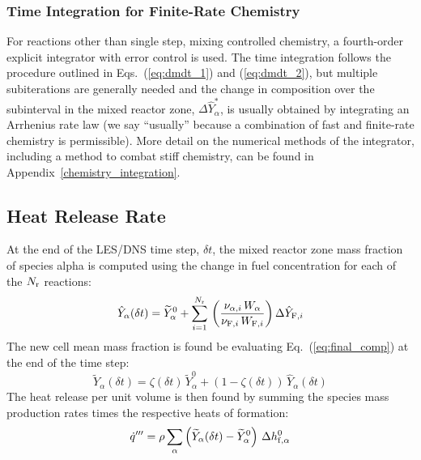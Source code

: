 \subsubsection{Time Integration for Finite-Rate Chemistry}

For reactions other than single step, mixing controlled chemistry, a fourth-order explicit integrator with error control is used. The time integration follows the procedure outlined in Eqs.~(\ref{eq:dmdt_1}) and (\ref{eq:dmdt_2}), but multiple subiterations are generally needed and the change in composition over the subinterval in the mixed reactor zone, $\Delta \hat{Y}_\alpha^*$, is usually obtained by integrating an Arrhenius rate law (we say ``usually'' because a combination of fast and finite-rate chemistry is permissible). More detail on the numerical methods of the integrator, including a method to combat stiff chemistry, can be found in Appendix~\ref{chemistry_integration}.


\subsection{Heat Release Rate}
\label{sec:hrr}

At the end of the LES/DNS time step, $\delta t$, the mixed reactor zone mass fraction of species alpha is computed using the change in fuel concentration for each of the $N_{\rm r}$ reactions:
\begin{equation}\label{eq:change_alpha}
\hat{Y}_\alpha(\delta t) = \widetilde{Y}_\alpha^0 + \sum_{i=1}^{N_{\rm r}} \,\left(\frac{\nu_{\alpha,i} \,W_{\alpha}}{\nu_{{\rm F},i} \,W_{{\rm F},i}}\right)\Delta \hat{Y}_{{\rm F},i}
\end{equation}
The new cell mean mass fraction is found be evaluating Eq.~(\ref{eq:final_comp}) at the end of the time step:
\begin{equation}
\label{eq:final_comp2}
\widetilde{Y}_{\alpha}(\delta t)= \zeta(\delta t) \, \widetilde{Y}_{\alpha}^0 + (1-\zeta(\delta t)) \, \hat{Y}_{\alpha}(\delta t)
\end{equation}
The heat release per unit volume is then found by summing the species mass production rates times the respective heats of formation:
\begin{equation}\label{eq:vol_heat_gen}
\dot{q}''' = \rho  \sum_{\alpha} \left( \widetilde{Y}_{\alpha}(\delta t)-\widetilde{Y}_{\alpha}^0 \right) \, \Delta h_{{\rm f},\alpha}^0  
\end{equation}




